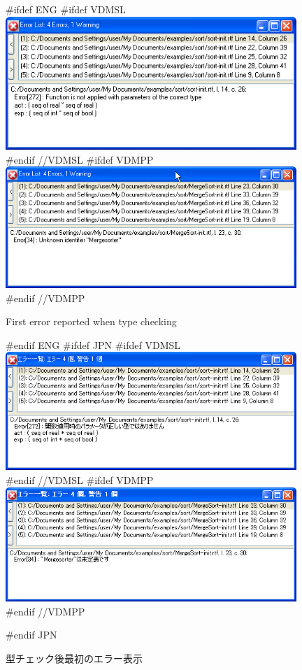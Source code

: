 \documentclass[\pformat,12pt]{article}
\begin{document}
\begin{figure}[tbh]
\begin{center}
#ifdef ENG
#ifdef VDMSL
\includegraphics[width=11cm]{typeError1-slENG.png}
#endif //VDMSL
#ifdef VDMPP
\includegraphics[width=11cm]{typeError1-ppENG.png}
#endif //VDMPP
\caption{First error reported when type checking}
#endif ENG
#ifdef JPN
#ifdef VDMSL
\includegraphics[width=11cm]{typeError1-sl.png}
#endif //VDMSL
#ifdef VDMPP
\includegraphics[width=11cm]{typeError1-pp.png}
#endif //VDMPP
\caption{型チェック後最初のエラー表示}
#endif JPN
\label{fig:type_error1}
\end{center}
\end{figure}
\end{document}
